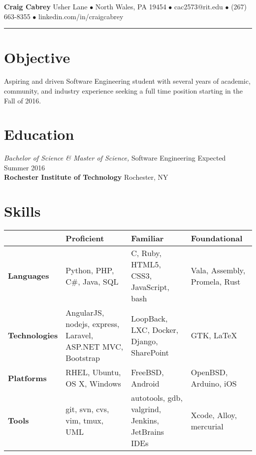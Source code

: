 \documentclass[margin]{res}
\newcommand{\fullbar}{\rule{\textwidth}{0.4pt}}
\begin{document}
{\Huge\textbf{Craig Cabrey}}
\vspace{0.25cm}
 Usher Lane $\bullet$
North Wales, PA 19454 $\bullet$
cac2573@rit.edu $\bullet$
(267) 663-8355 $\bullet$
linkedin.com/in/craigcabrey \vspace{-0.5cm}
\newline
\fullbar
\vspace{-0.75cm}

\begin{resume}

\section{Objective}  

Aspiring and driven Software Engineering student with several years of
academic, community, and industry experience seeking a full time position
starting in the Fall of 2016.

\section{Education}

{\sl Bachelor of Science \& Master of Science,} Software Engineering
\hfill Expected Summer 2016 \\
\textbf{Rochester Institute of Technology} \hfill Rochester, NY
 
\section{Skills} 

{
\small
\renewcommand{\arraystretch}{1.5}
\begin{tabular}{
    >{\arraybackslash}p{2cm}
    >{\arraybackslash}p{5cm}
    >{\arraybackslash}p{4cm}
    >{\arraybackslash}p{3.75cm}}
    & \textbf{Proficient} & \textbf{Familiar} & \textbf{Foundational} \\ \hline
  \textbf{Languages} & Python, PHP, C\#, Java, SQL & C, Ruby, HTML5, CSS3,
                       JavaScript, bash & Vala, Assembly, Promela, Rust \\ \hline
  \textbf{Technologies} & AngularJS, nodejs, express, Laravel,
                          ASP.NET MVC, Bootstrap & LoopBack, LXC, Docker,
                          Django, SharePoint & GTK, \LaTeX \\ \hline
  \textbf{Platforms} & RHEL, Ubuntu, OS X, Windows & FreeBSD, Android &
                       OpenBSD, Arduino, iOS \\ \hline
  \textbf{Tools} & git, svn, cvs, vim, tmux, UML & autotools, gdb, valgrind,
                   Jenkins, JetBrains IDEs & Xcode, Alloy, mercurial
\end{tabular}
}


\end{resume}
\end{document}
